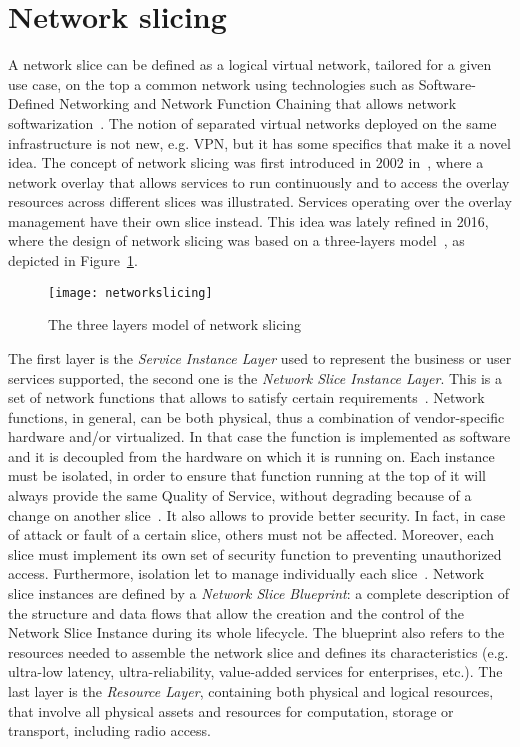 \section{Network slicing}
A network slice can be defined as a logical virtual network, tailored for a
given use case, on the top a common network using technologies such as
Software-Defined Networking and Network Function Chaining that allows network
softwarization~\cite{ordonez2017network}. The notion of separated virtual
networks deployed on the same infrastructure is not new, e.g. VPN, but it has
some specifics that make it a novel idea. The concept of network slicing was
first introduced in 2002 in~\cite{peterson2003blueprint}, where a network 
overlay that allows services to run continuously and to access the overlay
resources across different slices was illustrated.
Services operating over the overlay management have their own slice instead.
This idea was lately refined in 2016, where the design of network slicing was
based on a three-layers model~\cite{alliance2016description}, as depicted in 
Figure~\ref{chap:background:img:network_slicing}.

\begin{figure}[t]
  \centering
  \texttt{[image: networkslicing]}
  \caption[The three layers model of network slicing]{The three layers model of
    network slicing~\cite{alliance2016description}}
  \label{chap:background:img:network_slicing}
\end{figure}

The first layer is the \emph{Service Instance Layer} used to represent the
business or user services supported, the second one is the \emph{Network Slice
Instance Layer}. This is a set of network functions that allows to
satisfy certain requirements~\cite{kotulski2017end}. Network functions, in
general, can be both physical, thus a combination of vendor-specific hardware
and/or virtualized. In that case the function is implemented as software and it
is decoupled from the hardware on which it is running on. Each instance must be
isolated, in order to ensure that function running at the top of it will always
provide the same Quality of Service, without degrading because of a change on
another slice~\cite{richart2016resource}. It also allows to provide better
security. In fact, in case of attack or fault of a certain slice, others must
not be affected. Moreover, each slice must implement its own set of security
function to preventing unauthorized access. Furthermore, isolation let to
manage individually each slice~\cite{ordonez2017network}. Network slice
instances are defined by a \emph{Network Slice Blueprint}: a complete
description of the structure and data flows that allow the creation and the
control of the Network Slice Instance during its whole lifecycle. The blueprint
also refers to the resources needed to assemble the network slice and defines
its characteristics (e.g. ultra-low latency, ultra-reliability, value-added
services for enterprises, etc.). The last layer is the \emph{Resource Layer},
containing both physical and logical resources, that involve all physical
assets and resources for computation, storage or transport, including radio
access.


